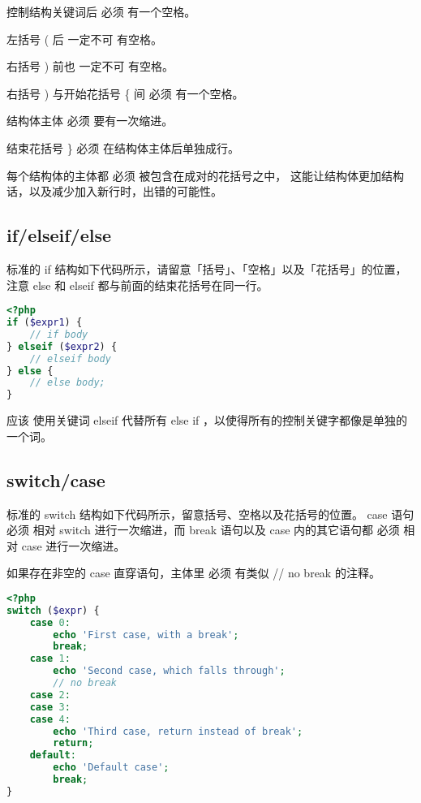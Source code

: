 \begin{compactitem}
\item 控制结构关键词后 必须 有一个空格。
\item 左括号 ( 后 一定不可 有空格。
\item 右括号 ) 前也 一定不可 有空格。
\item 右括号 ) 与开始花括号 \{ 间 必须 有一个空格。
\item 结构体主体 必须 要有一次缩进。
\item 结束花括号 \} 必须 在结构体主体后单独成行。
\end{compactitem}

每个结构体的主体都 必须 被包含在成对的花括号之中， 这能让结构体更加结构话，以及减少加入新行时，出错的可能性。


\subsection{if/elseif/else}

标准的 if 结构如下代码所示，请留意「括号」、「空格」以及「花括号」的位置， 注意 else 和 elseif 都与前面的结束花括号在同一行。


\begin{lstlisting}[language=PHP]
<?php
if ($expr1) {
    // if body
} elseif ($expr2) {
    // elseif body
} else {
    // else body;
}
\end{lstlisting}

应该 使用关键词 elseif 代替所有 else if ，以使得所有的控制关键字都像是单独的一个词。

\subsection{switch/case}

标准的 switch 结构如下代码所示，留意括号、空格以及花括号的位置。 case 语句 必须 相对 switch 进行一次缩进，而 break 语句以及 case 内的其它语句都 必须 相对 case 进行一次缩进。

如果存在非空的 case 直穿语句，主体里 必须 有类似 // no break 的注释。




\begin{lstlisting}[language=PHP]
<?php
switch ($expr) {
    case 0:
        echo 'First case, with a break';
        break;
    case 1:
        echo 'Second case, which falls through';
        // no break
    case 2:
    case 3:
    case 4:
        echo 'Third case, return instead of break';
        return;
    default:
        echo 'Default case';
        break;
}
\end{lstlisting}


